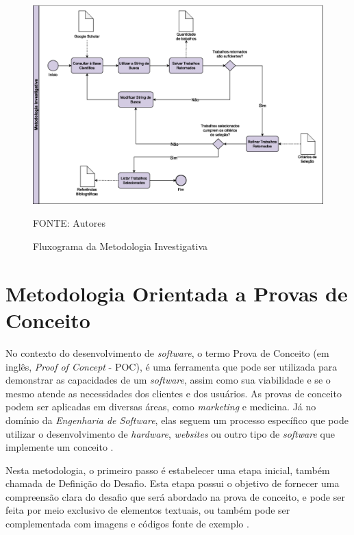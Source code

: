 \begin{figure}[h]
    \caption{Fluxograma da Metodologia Investigativa}
	\centering
	\includegraphics[keepaspectratio=true,scale=0.55]{figuras/metodologia_investigativa.eps}
    \parbox{\linewidth}{\centering FONTE: Autores}
	\label{metodologia_investigativa}
\end{figure}

\section{Metodologia Orientada a Provas de Conceito}
\label{section:metod_poc}

No contexto do desenvolvimento de \textit{software}, o termo Prova de Conceito (em inglês, 
\textit{Proof of Concept} - POC), é uma ferramenta que pode ser utilizada para demonstrar as 
capacidades de um \textit{software}, assim como sua viabilidade e se o mesmo atende as necessidades 
dos clientes e dos usuários. As provas de conceito podem ser aplicadas em diversas áreas, como 
\textit{marketing} e medicina. Já no domínio da \textit{Engenharia de Software}, elas seguem um 
processo específico que pode utilizar o desenvolvimento de \textit{hardware}, \textit{websites} ou 
outro tipo de \textit{software} que implemente um conceito \cite{prasanna2021poc}.

Nesta metodologia, o primeiro passo é estabelecer uma etapa inicial, também chamada 
de Definição do Desafio. Esta etapa possui o objetivo de fornecer uma compreensão clara do desafio 
que será abordado na prova de conceito, e pode ser feita por meio exclusivo de elementos textuais,  
ou também pode ser complementada com imagens e códigos fonte de exemplo \cite{silva2023microfrontends}.

